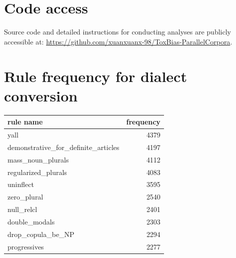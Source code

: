 \documentclass[11pt]{article}
\begin{document}
\newpage

\appendix

\section{Code access}

Source code and detailed instructions for conducting analyses are publicly accessible at: \href{https://github.com/xuanxuanx-98/ToxBias-ParallelCorpora}{https://github.com/xuanxuanx-98/ToxBias-ParallelCorpora}.

\section{Rule frequency for dialect conversion} \label{rules}

\begin{center}
\begin{tabular}{lr}
\hline
\textbf{rule name}                     & \textbf{frequency} \\ \hline
yall                                   & 4379               \\
demonstrative\_for\_definite\_articles & 4197               \\
mass\_noun\_plurals                    & 4112               \\
regularized\_plurals                   & 4083               \\
uninflect                              & 3595               \\
zero\_plural                           & 2540               \\
null\_relcl                            & 2401               \\
double\_modals                         & 2303               \\
drop\_copula\_be\_NP                   & 2294               \\
progressives                           & 2277               \\ \hline
\end{tabular}
\end{center}
\end{document}
